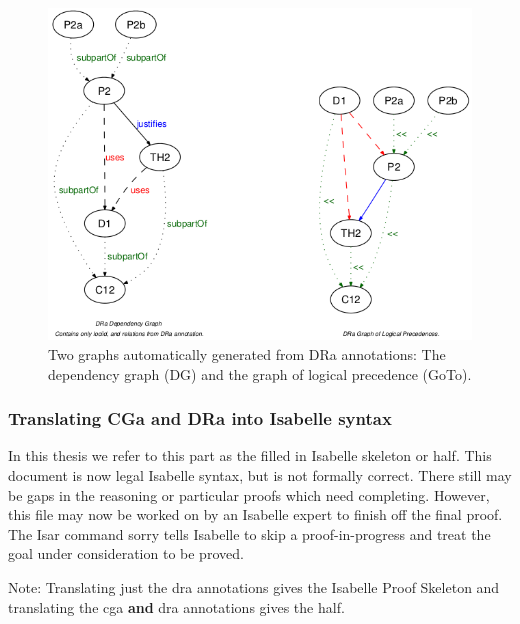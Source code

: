 \begin{figure}[H]
\begin{center}
\includegraphics[scale=0.6]{Figures/Background/depandgoto.png}
\end{center}
\caption{{Two graphs automatically generated from DRa annotations: The
dependency graph (DG) and the graph of logical precedence (GoTo)}.
 \label{fig:depandgoto}}
\end{figure}

\subsubsection{Translating CGa and DRa into Isabelle syntax}

In this thesis we refer to this part as the filled in
Isabelle skeleton or \gls{half}. This document is now legal Isabelle syntax, but
is not formally correct. There still may be gaps in the reasoning or particular
proofs which need completing. However, this file may now be worked on by an
Isabelle expert to finish off the final proof. The Isar command sorry tells
Isabelle to skip a proof-in-progress and treat the goal under consideration to
be proved.

Note: Translating just the \gls{dra} annotations gives the Isabelle Proof
Skeleton and translating the \gls{cga} \textbf{and} \gls{dra} annotations gives
the \gls{half}.

